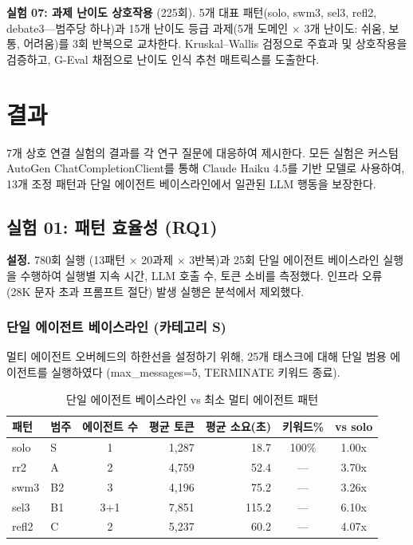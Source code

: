 \documentclass[a4paper,11pt]{article}
\begin{document}
\textbf{실험 07: 과제 난이도 상호작용} (225회). 5개 대표 패턴(solo, swm3, sel3, refl2, debate3---범주당 하나)과 15개 난이도 등급 과제(5개 도메인 $\times$ 3개 난이도: 쉬움, 보통, 어려움)를 3회 반복으로 교차한다. Kruskal--Wallis 검정으로 주효과 및 상호작용을 검증하고, G-Eval 채점으로 난이도 인식 추천 매트릭스를 도출한다.

\section{결과}
\label{sec:results}

7개 상호 연결 실험의 결과를 각 연구 질문에 대응하여 제시한다. 모든 실험은 커스텀 AutoGen ChatCompletionClient를 통해 Claude Haiku 4.5를 기반 모델로 사용하여, 13개 조정 패턴과 단일 에이전트 베이스라인에서 일관된 LLM 행동을 보장한다.

\subsection{실험 01: 패턴 효율성 (RQ1)}

\textbf{설정.} 780회 실행 (13패턴 $\times$ 20과제 $\times$ 3반복)과 25회 단일 에이전트 베이스라인 실행을 수행하여 실행별 지속 시간, LLM 호출 수, 토큰 소비를 측정했다. 인프라 오류 (28K 문자 초과 프롬프트 절단) 발생 실행은 분석에서 제외했다.

\subsubsection{단일 에이전트 베이스라인 (카테고리 S)}

멀티 에이전트 오버헤드의 하한선을 설정하기 위해, 25개 태스크에 대해 단일 범용 에이전트를 실행하였다 (max\_messages=5, TERMINATE 키워드 종료).

\begin{table}[H]
\centering
\caption{단일 에이전트 베이스라인 vs 최소 멀티 에이전트 패턴}
\label{tab:solo-baseline}
{\small
\begin{tabular}{llcrrcc}
\toprule
패턴 & 범주 & 에이전트 수 & 평균 토큰 & 평균 소요(초) & 키워드\% & vs solo \\
\midrule
solo & S & 1 & 1,287 & 18.7 & 100\% & 1.00x \\
rr2  & A & 2 & 4,759 & 52.4 & --- & 3.70x \\
swm3 & B2 & 3 & 4,196 & 75.2 & --- & 3.26x \\
sel3 & B1 & 3+1 & 7,851 & 115.2 & --- & 6.10x \\
refl2 & C & 2 & 5,237 & 60.2 & --- & 4.07x \\
\bottomrule
\end{tabular}
}
\end{table}
\end{document}
